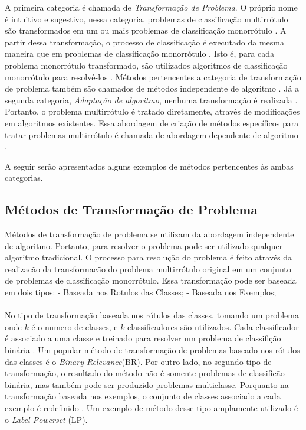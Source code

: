 A primeira categoria é chamada de \textit{Transformação de Problema}. O próprio nome é intuitivo e sugestivo, nessa categoria, problemas de classificação multirrótulo são transformados em um ou mais problemas de classificação monorrótulo \cite{chermanaprendizado}. A partir dessa transformação, o processo de classificação é executado da mesma maneira que em problemas de classificação monorrótulo \cite{modi2012experimental}. Isto é, para cada problema monorrótulo transformado, são utilizados algoritmos de classificação monorrótulo para resolvê-los \cite{chermanaprendizado}. Métodos pertencentes a categoria de transformação de problema também são chamados de métodos independente de algoritmo \cite{modi2012experimental}.
Já a segunda categoria, \textit{Adaptação de algoritmo}, nenhuma transformação é realizada \cite{chermanaprendizado}. Portanto, o problema multirrótulo é tratado diretamente, através de modificações em algoritmos existentes\cite{modi2012experimental}. Essa abordagem de criação de métodos específicos para tratar problemas multirrótulo é chamada de abordagem dependente de algoritmo \cite{faceli2011inteligencia}. 

A seguir serão apresentados alguns exemplos de métodos pertencentes às ambas categorias.

\subsection{Métodos de Transformação de Problema}

Métodos de transformação de problema se utilizam da abordagem independente de algoritmo. Portanto, para resolver o problema pode ser utilizado qualquer algoritmo tradicional. O processo  para resolução do problema é feito através da realizacão da transformacão do problema multirrótulo original em um conjunto de problemas de classificação monorrótulo. Essa transformação pode ser baseada em dois tipos\cite{faceli2011inteligencia}:
\newline
{} - Baseada nos Rotulos das Classes;
 - Baseada nos Exemplos; 
 
\paragraph{}
No tipo de transformação baseada nos rótulos das classes, tomando um problema onde $k$ é o numero de classes, e $k$ classificadores são utilizados. Cada classificador é associado a uma classe e treinado para resolver um problema de classifição binária \cite{faceli2011inteligencia}. Um popular método de transformação de problemas baseado nos rótulos das classes é o \textit{Binary Relevance}(BR)\cite{tsoumakas2009mining}. Por outro lado, no segundo tipo de transformação, o resultado do método não é somente problemas de classificão binária, mas também pode ser produzido problemas multiclasse. Porquanto na transformação baseada nos exemplos, o conjunto de classes associado a cada exemplo é redefinido \cite{faceli2011inteligencia}. Um exemplo de método desse tipo amplamente utilizado é o \textit{Label Powerset} (LP)\cite{tsoumakas2009mining}.
 
